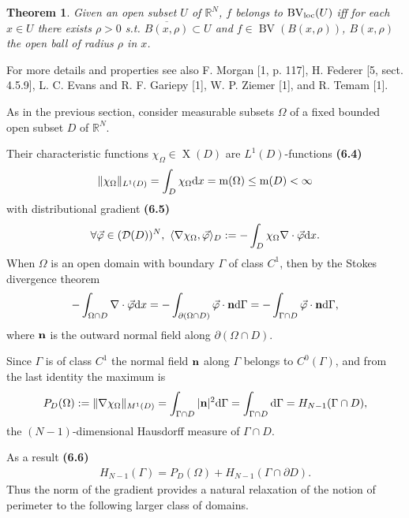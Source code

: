 \documentclass{book}
\numberwithin{equation}{section}
\newtheorem{theorem}{Theorem}[section]
\begin{document}
\begin{enumerate}
    \begin{theorem}
        Given an open subset $U$ of $\mathbb{R}^N$, $f$ belongs to $\operatorname{BV}_{\rm loc}(U)$ iff for each $x\in U$ there exists $\rho > 0$ s.t. $\overline{B(x,\rho)}\subset U$ and $f\in\operatorname{BV}(B(x,\rho))$, $B(x,\rho)$ the open ball of radius $\rho$ in $x$.
    \end{theorem}
    For more details and properties see also F. Morgan [1, p. 117], H. Federer [5, sect. 4.5.9], L. C. Evans and R. F. Gariepy [1], W. P. Ziemer [1], and R. Temam [1].
    
    As in the previous section, consider measurable subsets $\Omega$ of a fixed bounded open subset $D$ of $\mathbb{R}^N$.
    
    Their characteristic functions $\chi_\Omega\in\operatorname{X}(D)$ are $L^1(D)$-functions \textbf{(6.4)}
    \begin{align*}
        \|\chi_\Omega\|_{L^1(D)} = \int_D \chi_\Omega{\rm d}x = \operatorname{m}(\Omega)\le\operatorname{m}(D) < \infty
    \end{align*}
    with distributional gradient \textbf{(6.5)}
    \begin{align*}
        \forall\vec{\varphi}\in(\mathcal{D}(D))^N,\ \langle\nabla\chi_\Omega,\vec{\varphi}\rangle_D := -\int_D \chi_\Omega\nabla\cdot\vec{\varphi}{\rm d}x.
    \end{align*}
    When $\Omega$ is an open domain with boundary $\Gamma$ of class $C^1$, then by the Stokes divergence theorem
    \begin{align*}
        -\int_{\Omega\cap D} \nabla\cdot\vec{\varphi}{\rm d}x = -\int_{\partial(\Omega\cap D)} \vec{\varphi}\cdot{\bf n}{\rm d}\Gamma = -\int_{\Gamma\cap D} \vec{\varphi}\cdot{\bf n}{\rm d}\Gamma,
    \end{align*}
    where ${\bf n}$ is the outward normal field along $\partial(\Omega\cap D)$.
    
    Since $\Gamma$ is of class $C^1$ the normal field ${\bf n}$ along $\Gamma$ belongs to $C^0(\Gamma)$, and from the last identity the maximum is
    \begin{align*}
        P_D(\Omega) := \|\nabla\chi_\Omega\|_{M^1(D)} = \int_{\Gamma\cap D} |{\bf n}|^2{\rm d}\Gamma = \int_{\Gamma\cap D} {\rm d}\Gamma = H_{N-1}(\Gamma\cap D),
    \end{align*}
    the $(N - 1)$-dimensional Hausdorff measure of $\Gamma\cap D$.
    
    As a result \textbf{(6.6)}
    \begin{align*}
        H_{N-1}(\Gamma) = P_D(\Omega) + H_{N-1}(\Gamma\cap\partial D).
    \end{align*}
    Thus the norm of the gradient provides a natural relaxation of the notion of perimeter to the following larger class of domains.
    

\end{enumerate}
\end{document}
